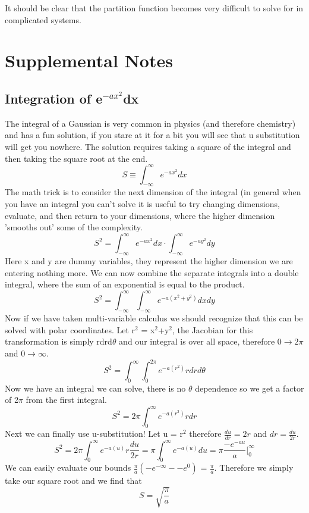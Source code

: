 \documentclass{article}
\begin{document}
 It should be clear that the partition function becomes very difficult to solve for in complicated systems. 
 
 \section{Supplemental Notes}
 \subsection*{Integration of e$^{-ax^2}$dx}
The integral of a Gaussian is very common in physics (and therefore chemistry) and has a fun solution, if you stare at it for a bit you will see that u substitution will get you nowhere. 
The solution requires taking a square of the integral and then taking the square root at the end. 
\begin{equation}
 S \equiv \int_{-\infty}^\infty e^{-ax^2}dx
\end{equation}
The math trick is to consider the next dimension of the integral (in general when you have an integral you can't solve it is useful to try changing dimensions, evaluate, and then return to your dimensions, where the higher dimension 'smooths out' some of the complexity. 
\begin{equation}
 S^2 = \int_{-\infty}^\infty e^{-ax^2}dx \cdot \int_{-\infty}^\infty e^{-ay^2}dy
\end{equation}
Here x and y are dummy variables, they represent the higher dimension we are entering nothing more. 
We can now combine the separate integrals into a double integral, where the sum of an exponential is equal to the product. 
\begin{equation}
 S^2 = \int_{-\infty}^\infty \int_{-\infty}^\infty e^{-a(x^2+y^2)}dxdy
\end{equation}
Now if we have taken multi-variable calculus we should recognize that this can be solved with polar coordinates. 
Let r$^2$ = x$^2$+y$^2$, the Jacobian for this transformation is simply rdrd$\theta$ and our integral is over all space, therefore 0$\rightarrow 2\pi$ and 0$\rightarrow \infty$. 
\begin{equation}
 S^2 = \int_{0}^\infty \int_{0}^{2\pi} e^{-a(r^2)}rdrd\theta
\end{equation}
Now we have an integral we can solve, there is no $\theta$ dependence so we get a factor of 2$\pi$ from the first integral. 
\begin{equation}
 S^2 = 2\pi\int_{0}^\infty e^{-a(r^2)}rdr
\end{equation}
Next we can finally use u-substitution!
Let u = r$^2$ therefore $\frac{du}{dr} = 2r$ and $dr = \frac{du}{2r}$.
\begin{equation}
 S^2 = 2\pi\int_{0}^\infty e^{-a(u)}r \frac{du}{2r} = \pi\int_{0}^\infty e^{-a(u)} du =\pi \frac{-e^{-au}}{a} \Big|_0^\infty
\end{equation}
We can easily evaluate our bounds $\frac{\pi}{a}\left ( -e^{-\infty} - -e^0 \right )$ = $\frac{\pi}{a}$. 
Therefore we simply take our square root and we find that
\begin{equation}
 S = \sqrt{\frac{\pi}{a}}
\end{equation}
\end{document}
